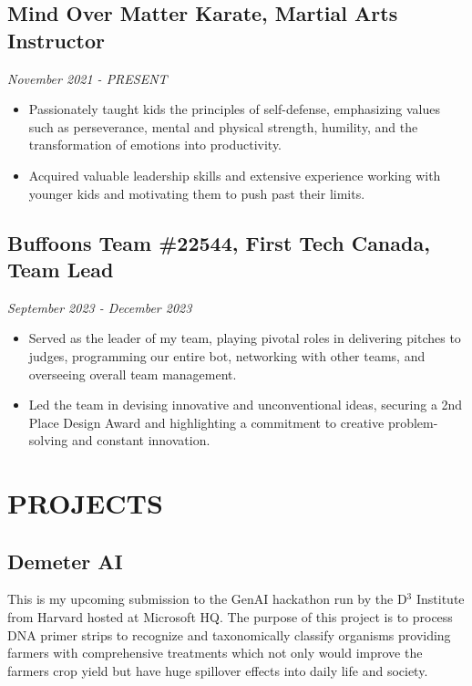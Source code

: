 \documentclass[a4paper,10pt]{article}
\begin{document}
\subsection*{Mind Over Matter Karate, Martial Arts Instructor}
\textit{November 2021 - PRESENT}\\
\begin{itemize}[leftmargin=*]
    \item Passionately taught kids the principles of self-defense, emphasizing values such as perseverance, mental and physical strength, humility, and the transformation of emotions into productivity.
    \item Acquired valuable leadership skills and extensive experience working with younger kids and motivating them to push past their limits.
\end{itemize}

\subsection*{Buffoons Team \#22544, First Tech Canada, Team Lead}
\textit{September 2023 - December 2023}\\
\begin{itemize}[leftmargin=*]
    \item Served as the leader of my team, playing pivotal roles in delivering pitches to judges, programming our entire bot, networking with other teams, and overseeing overall team management.
    \item Led the team in devising innovative and unconventional ideas, securing a 2nd Place Design Award and highlighting a commitment to creative problem-solving and constant innovation.
\end{itemize}

\section*{PROJECTS}

\subsection*{Demeter AI}
This is my upcoming submission to the GenAI hackathon run by the D\(^3\) Institute from Harvard hosted at Microsoft HQ. The purpose of this project is to process DNA primer strips to recognize and taxonomically classify organisms providing farmers with comprehensive treatments which not only would improve the farmers crop yield but have huge spillover effects into daily life and society.
\end{document}

